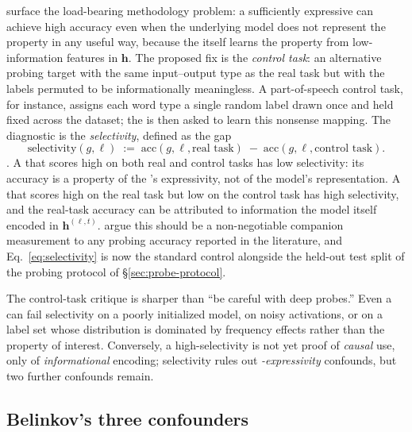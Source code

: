\citet{hewitt2019-control-tasks} surface the load-bearing methodology
problem: a sufficiently expressive  can achieve high accuracy
even when the underlying model does not represent the property in any
useful way, because the  itself learns the property from
low-information features in $\mathbf{h}$. The proposed fix is the
\emph{control task}: an alternative probing target with the same
input--output type as the real task but with the labels permuted to be
informationally meaningless. A part-of-speech control task, for
instance, assigns each word type a single random label drawn once and
held fixed across the dataset; the  is then asked to learn this
nonsense mapping. The diagnostic is the \emph{selectivity}, defined
as the gap
\begin{equation}
  \mathrm{selectivity}(g, \ell)
  \;:=\; \mathrm{acc}(g, \ell, \text{real task})
  \;-\; \mathrm{acc}(g, \ell, \text{control task}).
  \label{eq:selectivity}
\end{equation}
\citep{hewitt2019-control-tasks}. A  that scores high on both
real and control tasks has low selectivity: its accuracy is a property
of the 's expressivity, not of the model's representation. A
 that scores high on the real task but low on the control task
has high selectivity, and the real-task accuracy can be attributed to
information the model itself encoded in $\mathbf{h}^{(\ell, t)}$.
\citet{hewitt2019-control-tasks} argue this should be a non-negotiable
companion measurement to any probing accuracy reported in the
literature, and Eq.~\eqref{eq:selectivity} is now the standard
control alongside the held-out test split of the probing protocol of
\S\ref{sec:probe-protocol}.

The control-task critique is sharper than ``be careful with deep
probes.'' Even a  can fail selectivity on a poorly
initialized model, on noisy activations, or on a label set whose
distribution is dominated by frequency effects rather than the
property of interest. Conversely, a high-selectivity  is not yet
proof of \emph{causal} use, only of \emph{informational} encoding;
selectivity rules out \emph{-expressivity} confounds, but two
further confounds remain.

\subsection{Belinkov's three confounders}
\label{sec:belinkov-taxonomy}

